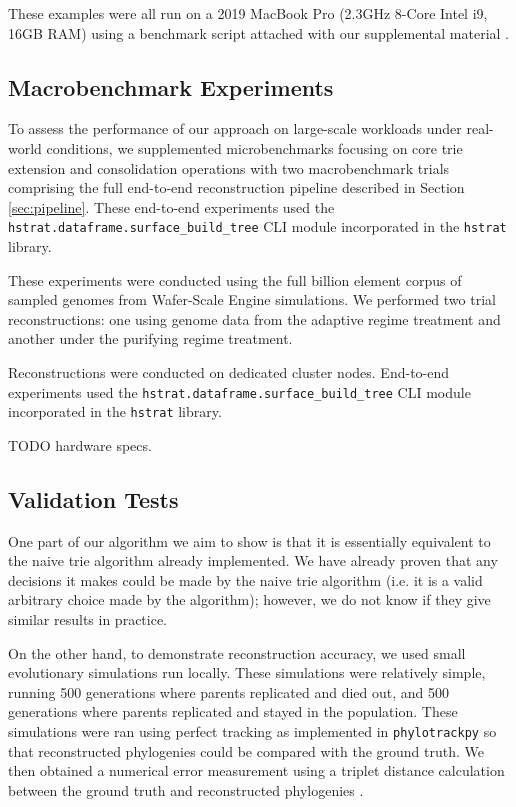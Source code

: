 These examples were all run on a 2019 MacBook Pro (2.3GHz 8-Core Intel i9, 16GB RAM) using a benchmark script attached with our supplemental material \citep{supplemental}.

\subsection{Macrobenchmark Experiments}

To assess the performance of our approach on large-scale workloads under real-world conditions, we supplemented microbenchmarks focusing on core trie extension and consolidation operations with two macrobenchmark trials comprising the full end-to-end reconstruction pipeline described in Section \ref{sec:pipeline}.
These end-to-end experiments used the \texttt{hstrat.dataframe.surface\_build\_tree} CLI module incorporated in the \texttt{hstrat} library.

These experiments were conducted using the full billion element corpus of sampled genomes from Wafer-Scale Engine simulations.
We performed two trial reconstructions: one using genome data from the adaptive regime treatment and another under the purifying regime treatment.

Reconstructions were conducted on dedicated cluster nodes.
End-to-end experiments used the \texttt{hstrat.dataframe.surface\_build\_tree} CLI module incorporated in the \texttt{hstrat} library.

TODO hardware specs.

\subsection{Validation Tests}

One part of our algorithm we aim to show is that it is essentially equivalent to the naive trie algorithm already implemented.
We have already proven that any decisions it makes could be made by the naive trie algorithm (i.e. it is a valid arbitrary choice made by the algorithm); however, we do not know if they give similar results in practice.

On the other hand, to demonstrate reconstruction accuracy, we used small evolutionary simulations run locally. 
These simulations were relatively simple, running 500 generations where parents replicated and died out, and 500 generations where parents replicated and stayed in the population. These simulations were ran using perfect tracking as implemented in \texttt{phylotrackpy} \citep{dolson2024phylotrack} so that reconstructed phylogenies could be compared with the ground truth.
We then obtained a numerical error measurement using a triplet distance calculation between the ground truth and reconstructed phylogenies \citep{critchlow1996triples}.

